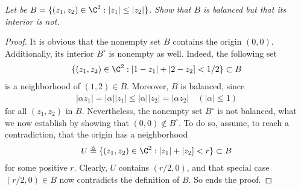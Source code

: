 \textit{Let be %
%
  $B = \{(z_{1}, z_{2}) \in \C^2: |z_{1}| \leq |z_{2}| \}$. %
%
Show that $B$ is balanced but that its interior is not.
}
%
\begin{proof}
It is obvious that the nonempty set $B$ contains the origin $(0,0)$. %
Additionally, its interior $B^\circ$ is nonempty as well. %
Indeed, the following set %
%
\begin{align}
  \{(z_1, z_2) \in \C^2: |1- z_1| + |2- z_2] < 1/2 \} \subset B %
\end{align}
%
is a neighborhood of $(1, 2) \in B$. %
Moreover, $B$ is balanced, since
\begin{align}
  |\alpha z_1|  = |\alpha| |z_1| \leq  |\alpha| |z_2| = |\alpha z_2| %
  \quad (|\alpha| \leq 1)
\end{align}
%
for all $(z_1, z_2)$ in $B$. %
%
Nevertheless, the nonempty set $B^\circ$ is not balanced, what we now %
establish by showing that $(0, 0) \notin B^\circ$. %
%
To do so, assume, to reach a contradiction, %
that the origin has a neighborhood %
%
\begin{align}
  U \triangleq \{(z_1, z_2) \in \C^2: |z_1| + |z_2] < r \} \subset B %
\end{align}
%
for some positive $r$. Clearly, $U$ contains $(r/2, 0)$,  %
and that special case $(r/2, 0) \in B$ now contradicts the definition of $B$. %
So ends the proof.
\end{proof}
